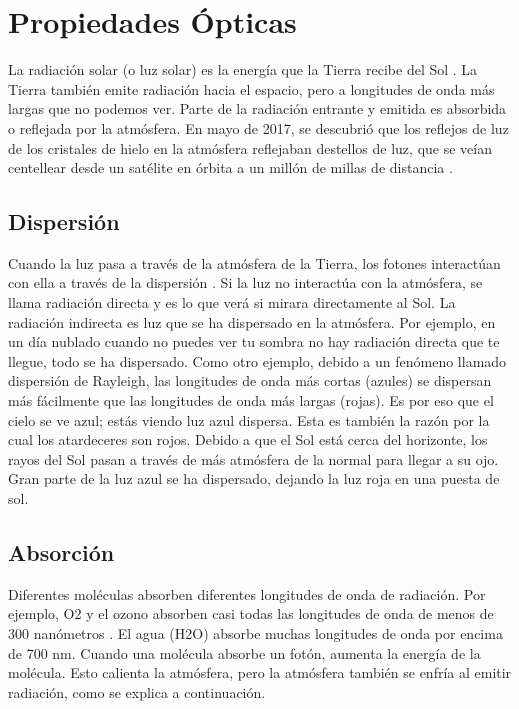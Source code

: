 \documentclass[12pt]{article}
\begin{document}
\section{Propiedades Ópticas}

La radiación solar (o luz solar) es la energía que la Tierra recibe del Sol . La Tierra también emite radiación hacia el espacio, pero a longitudes de onda más largas que no podemos ver. Parte de la radiación entrante y emitida es absorbida o reflejada por la atmósfera. En mayo de 2017, se descubrió que los reflejos de luz de los cristales de hielo en la atmósfera reflejaban destellos de luz, que se veían centellear desde un satélite en órbita a un millón de millas de distancia .

\subsection{Dispersión}

Cuando la luz pasa a través de la atmósfera de la Tierra, los fotones interactúan con ella a través de la dispersión . Si la luz no interactúa con la atmósfera, se llama radiación directa y es lo que verá si mirara directamente al Sol. La radiación indirecta es luz que se ha dispersado en la atmósfera. Por ejemplo, en un día nublado cuando no puedes ver tu sombra no hay radiación directa que te llegue, todo se ha dispersado. Como otro ejemplo, debido a un fenómeno llamado dispersión de Rayleigh, las longitudes de onda más cortas (azules) se dispersan más fácilmente que las longitudes de onda más largas (rojas). Es por eso que el cielo se ve azul; estás viendo luz azul dispersa. Esta es también la razón por la cual los atardeceres son rojos. Debido a que el Sol está cerca del horizonte, los rayos del Sol pasan a través de más atmósfera de la normal para llegar a su ojo. Gran parte de la luz azul se ha dispersado, dejando la luz roja en una puesta de sol.

\subsection{Absorción}

Diferentes moléculas absorben diferentes longitudes de onda de radiación. Por ejemplo, O2 y el ozono absorben casi todas las longitudes de onda de menos de 300 nanómetros . El agua (H2O) absorbe muchas longitudes de onda por encima de 700 nm. Cuando una molécula absorbe un fotón, aumenta la energía de la molécula. Esto calienta la atmósfera, pero la atmósfera también se enfría al emitir radiación, como se explica a continuación.
\end{document}
